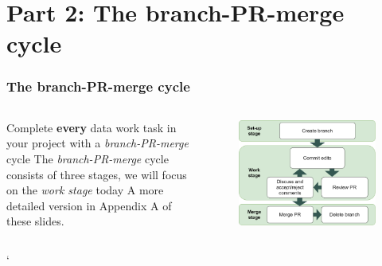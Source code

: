 \documentclass[aspectratio=169]{beamer} %
\begin{document}
\begin{frame}
\begin{columns}[c]
		
	\end{columns}
\end{frame}

\section{Part 2: \newline The branch-PR-merge cycle}

\begin{frame}
\frametitle{The branch-PR-merge cycle}

	\begin{columns}[c]

		\large Complete \textbf{every} data work task in your project with a \textit{branch-PR-merge} cycle
		\vspace{.5cm}\newline
		\large The \textit{branch-PR-merge} cycle consists of three stages,
		we will focus on the \textit{work stage} today
		\vspace{.5cm}\newline
		\large A more detailed version in Appendix A of these slides.

		\vspace{-.75cm}
		\begin{figure}
			\centering
			\includegraphics[width=\textwidth]{./img/branch-pr-merge-cycle.png}
		\end{figure}

	\end{columns}
	`\end{frame}
\end{document}
